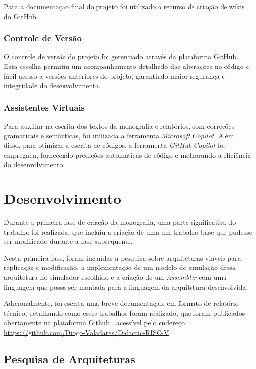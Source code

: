 \documentclass[
	12pt,				%
	openright,			%
	oneside,			%
	a4paper,			%
	english,			%
	french,				%
	spanish,			%
	brazil,				%
	]{abntex2}
\begin{document}
Para a documentação final do projeto foi utilizado o recurso de criação de wikis do GitHub.

\subsection{Controle de Versão}
O controle de versão do projeto foi gerenciado através da plataforma GitHub. Esta escolha permitiu um acompanhamento detalhado das alterações no código e fácil acesso a versões anteriores do projeto, garantindo maior segurança e integridade do desenvolvimento.

\subsection{Assistentes Virtuais}
Para auxiliar na escrita dos textos da monografia e relatórios, com correções gramaticais e semânticas, foi utilizada a ferramenta \textit{Microsoft Copilot}. Além disso, para otimizar a escrita de códigos, a ferramenta \textit{GitHub Copilot} foi empregada, fornecendo predições automáticas de código e melhorando a eficiência do desenvolvimento.

\chapter{Desenvolvimento}\label{desenvolvimento}

Durante a primeira fase de criação da monografia, uma parte significativa do trabalho foi realizada, que incluiu a criação de uma um trabalho base que pudesse ser modificado durante a fase subsequente.

Nesta primeira fase, foram incluídas a pesquisa sobre arquiteturas viáveis para replicação e modificação, a implementação de um modelo de simulação dessa arquitetura no simulador escolhido e a criação de um \textit{Assembler} com uma linguagem que possa ser montada para a linguagem da arquitetura desenvolvida.

Adicionalmente, foi escrita uma breve documentação, em formato de relatório técnico, detalhando como esses trabalhos foram realizado, que foram publicados abertamente na plataforma Github \cite{valadares_didactic-risc-i_2024}, acessível pelo endereço \url{https://github.com/Diogo-Valadares/Didactic-RISC-V}.

\section{Pesquisa de Arquiteturas}
\end{document}
